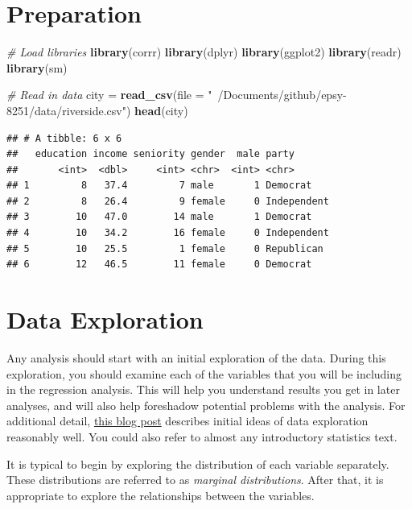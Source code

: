 \documentclass[]{book}
\newenvironment{Shaded}{\begin{snugshade}}{\end{snugshade}}
\newcommand{\CommentTok}[1]{\textcolor[rgb]{0.56,0.35,0.01}{\textit{#1}}}
\newcommand{\DataTypeTok}[1]{\textcolor[rgb]{0.13,0.29,0.53}{#1}}
\newcommand{\KeywordTok}[1]{\textcolor[rgb]{0.13,0.29,0.53}{\textbf{#1}}}
\newcommand{\NormalTok}[1]{#1}
\newcommand{\StringTok}[1]{\textcolor[rgb]{0.31,0.60,0.02}{#1}}
\theoremstyle{definition}
\theoremstyle{definition}
\theoremstyle{definition}
\theoremstyle{remark}
\begin{document}
\hypertarget{preparation}{%
\section{Preparation}\label{preparation}}

\begin{Shaded}
\begin{Highlighting}[]
\CommentTok{# Load libraries}
\KeywordTok{library}\NormalTok{(corrr)}
\KeywordTok{library}\NormalTok{(dplyr)}
\KeywordTok{library}\NormalTok{(ggplot2)}
\KeywordTok{library}\NormalTok{(readr)}
\KeywordTok{library}\NormalTok{(sm)}

\CommentTok{# Read in data}
\NormalTok{city =}\StringTok{ }\KeywordTok{read_csv}\NormalTok{(}\DataTypeTok{file =} \StringTok{"~/Documents/github/epsy-8251/data/riverside.csv"}\NormalTok{)}
\KeywordTok{head}\NormalTok{(city)}
\end{Highlighting}
\end{Shaded}

\begin{verbatim}
## # A tibble: 6 x 6
##   education income seniority gender  male party      
##       <int>  <dbl>     <int> <chr>  <int> <chr>      
## 1         8   37.4         7 male       1 Democrat   
## 2         8   26.4         9 female     0 Independent
## 3        10   47.0        14 male       1 Democrat   
## 4        10   34.2        16 female     0 Independent
## 5        10   25.5         1 female     0 Republican 
## 6        12   46.5        11 female     0 Democrat
\end{verbatim}

\hypertarget{data-exploration}{%
\section{Data Exploration}\label{data-exploration}}

Any analysis should start with an initial exploration of the data.
During this exploration, you should examine each of the variables that
you will be including in the regression analysis. This will help you
understand results you get in later analyses, and will also help
foreshadow potential problems with the analysis. For additional detail,
\href{https://www.analyticsvidhya.com/blog/2016/01/guide-data-exploration/}{this
blog post} describes initial ideas of data exploration reasonably well.
You could also refer to almost any introductory statistics text.

It is typical to begin by exploring the distribution of each variable
separately. These distributions are referred to as \emph{marginal
distributions}. After that, it is appropriate to explore the
relationships between the variables.
\end{document}
